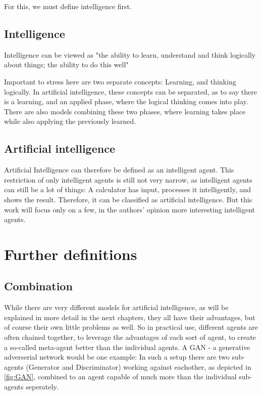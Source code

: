 For this, we must define intelligence first.
\subsection{Intelligence}
Intelligence can be viewed as "the ability to learn, understand and think logically about things; the ability to do this well" 
\cite{intelligence}

Important to stress here are two separate concepts: Learning, and thinking logically.
In artificial intelligence, these concepts can be separated, as to say there is a learning, and an applied phase, where the logical thinking comes into play. %
There are also models combining these two phases, where learning takes place while also applying the previously learned. 

\subsection{Artificial intelligence}
Artificial Intelligence can therefore be defined as an intelligent agent.
This restriction of only intelligent agents is still not very narrow, as intelligent agents can still be a lot of things: A calculator has input, processes it intelligently, and shows the result. Therefore, it can be classified as artificial intelligence. But this work will focus only on a few, in the authors' opinion more interesting intelligent agents.

\section{Further definitions}
\subsection{Combination}
While there are very different models for artificial intelligence, as will be explained in more detail in the next chapters, they all have their advantages, but of course their own little problems as well. So in practical use, different agents are often chained together, to leverage the advantages of each sort of agent, to create a so-called meta-agent better than the individual agents.
A GAN - a generative adverserial network would be one example: In such a setup there are two sub-agents (Generator and Discriminator) working against eachother, as depicted in \autoref{fig:GAN}, combined to an agent capable of much more than the individual sub-agents seperately.

